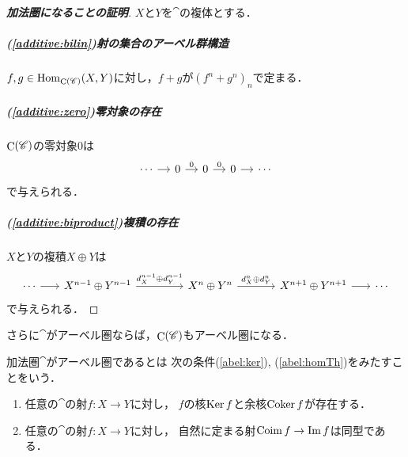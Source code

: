 \begin{proof}[\textbf{加法圏になることの証明}]
    $X$と$Y$を$\cat$の複体とする．
    \subparagraph*{(\ref{additive:bilin})射の集合のアーベル群構造}
    $f,g\in\mathop{\mathrm{Hom}}\nolimits_{\mathop{\mathrm{C}}\nolimits(\mathscr{C})}(X,Y)$に対し，$f+g$が$(f^n+g^n)_n$で定まる．
    \subparagraph*{(\ref{additive:zero})零対象の存在}
    $\mathop{\mathrm{C}}\nolimits(\mathscr{C})$の零対象0は
    \begin{equation*}%
        \begin{tikzcd}[column sep=0.4cm]
            \cdots
            \arrow[r]
            &
            0
            \arrow[r,"0"] 
            &%
            0
            \arrow[r,"0"]
            &%
            0
            \arrow[r, ""] 
            &%
            \cdots
        \end{tikzcd}
    \end{equation*}
    で与えられる．
    \subparagraph*{(\ref{additive:biproduct})複積の存在}    
    $X$と$Y$の複積$X\oplus Y$は
    \begin{equation*}%
        \begin{tikzcd}[column sep=1.2cm]
            \cdots
            \arrow[r]
            &[-0.6cm]
            X^{n-1}\oplus Y^{n-1}
            \arrow[r,"d_X^{n-1}\oplus d_Y^{n-1}"] 
            &[+0.3cm]%
            X^n\oplus Y^{n}
            \arrow[r,"d_X^{n}\oplus d_Y^{n}"]
            &%
            X^{n+1}\oplus Y^{n+1}
            \arrow[r, ""] 
            &[-0.6cm]%
            \cdots
        \end{tikzcd}
    \end{equation*}
    で与えられる．
\end{proof}

さらに$\cat$がアーベル圏ならば，$\mathop{\mathrm{C}}\nolimits(\mathscr{C})$もアーベル圏になる．
\begin{Attention*}
    加法圏$\cat$がアーベル圏であるとは
    次の条件(\ref{abel:ker}), (\ref{abel:homTh})をみたすことをいう．
    \begin{enumerate}
        \renewcommand{\labelenumi}{({\arabic{enumi}})}
        \setcounter{enumi}{3}
        \item 任意の$\cat$の射$f\colon X\to Y$に対し，
        $f$の核$\mathop{\mathrm{Ker}}\nolimits{f}$と余核$\mathop{\mathrm{Coker}}\nolimits f$が存在する．\label{abel:ker}
        \item 任意の$\cat$の射$f\colon X\to Y$に対し，
        自然に定まる射$\mathop{\mathrm{Coim}}\nolimits f\to\mathop{\mathrm{Im}}\nolimits f$は同型である．\label{abel:homTh}
    \end{enumerate}
\end{Attention*}

